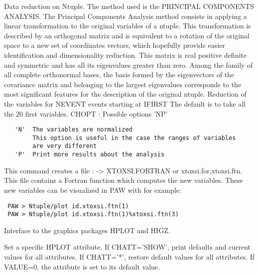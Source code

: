 \BEGARG
{}
\ENDARG
\BEGTEXT
Data reduction on Ntuple.
The method used is the PRINCIPAL COMPONENTS ANALYSIS.
The Principal Components Analysis method consists in applying
a linear transformation to the original variables of a ntuple.
This transformation is described by an orthogonal matrix and
is equivalent to a rotation of the original space to a new set
of coordinates vectors, which hopefully provide easier identification
and dimensionality reduction. This matrix is real positive definite
and symmetric and has all its eigenvalues greater than zero.
Among the family of all complete orthonormal bases, the basis
formed by the eigenvectors of the covariance matrix and belonging
to the largest eigenvalues corresponds to the most significant features
for the description of the original ntuple.
Reduction of the variables for NEVENT events starting at IFIRST
The default is to take all the 20 first variables.
CHOPT : Possible options 'NP'
\begin{verbatim}
   'N'  The variables are normalized
        This option is useful in the case the ranges of variables
        are very different
   'P'  Print more results about the analysis
\end{verbatim}
This command creates a file : -> XTOXSI.FORTRAN or xtoxsi.for,xtoxsi.ftn.
This file contains a Fortran function which computes the new variables.
These new variables can be visualized in PAW with for example:
\begin{verbatim}
 PAW > Ntuple/plot id.xtoxsi.ftn(1)
 PAW > Ntuple/plot id.xtoxsi.ftn(1)%xtoxsi.ftn(3)
\end{verbatim}
\ENDTEXT


\BEGTEXT
Interface to the graphics packages HPLOT and HIGZ.
\ENDTEXT

\BEGARG
{}
\ENDARG
\BEGTEXT
Set a specific HPLOT attribute.
If CHATT='SHOW', print defaults and current values for all attributes.
If CHATT='*', restore default values for all attributes.
If VALUE=0, the attribute is set to its default value.
\ENDTEXT


